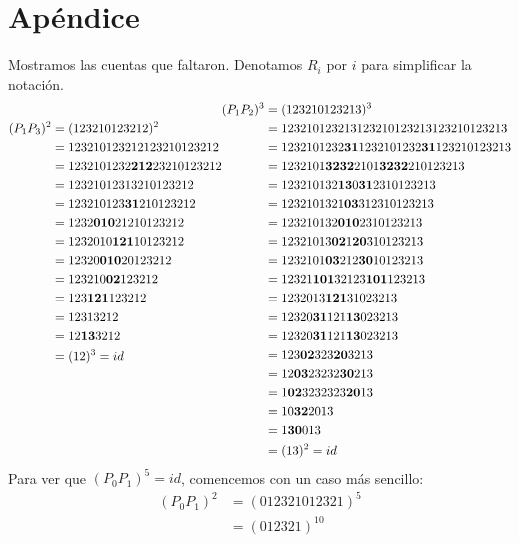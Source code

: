 \documentclass[spanish]{article}
\theoremstyle{definition}
\begin{document}
\section{Apéndice}
Mostramos las cuentas que faltaron. Denotamos $R_i$ por $i$ para simplificar la notación.
\begin{align*}
\begin{aligned}
	(P_1P_3)^2&=(123210123212)^2\\
	&=123210123212123210123212\\
	&=1232101232\mathbf{212}23210123212\\
	&=12321012313210123212\\
	&=123210123\mathbf{31}210123212\\
	&=1232\mathbf{010}21210123212\\
	&=1232010\mathbf{121}10123212\\
	&=12320\mathbf{010}20123212\\
	&=123210\mathbf{02}123212\\
	&=123\mathbf{121}123212\\
	&=12313212\\
	&=12\mathbf{13}3212\\
	&=(12)^3=id
	\\\leavevmode\\\leavevmode\\\leavevmode\\\leavevmode\\
\end{aligned}
\begin{aligned}
	(P_1P_2)^3&=(123210123213)^3\\
	&=123210123213123210123213123210123213\\
	&=1232101232\mathbf{31}1232101232\mathbf{31}123210123213\\
	&=1232101\mathbf{3232}2101\mathbf{3232}210123213\\
	&=123210132\mathbf{13}0\mathbf{31}2310123213\\
	&=1232101321\mathbf{03}312310123213\\
	&=123210132\mathbf{010}2310123213\\
	&=12321013\mathbf{02}1\mathbf{20}310123213\\
	&=1232101\mathbf{03}212\mathbf{30}10123213\\
	&=12321\mathbf{101}32123\mathbf{101}123213\\
	&=1232013\mathbf{121}31023213\\
	&=12320\mathbf{31}121\mathbf{13}023213\\
	&=12320\mathbf{31}121\mathbf{13}023213\\
	&=123\mathbf{02}323\mathbf{20}3213\\
	&=12\mathbf{03}23232\mathbf{30}213\\
	&=1\mathbf{02}3232323\mathbf{20}13\\
	&=10\mathbf{32}2013\\
	&=1\mathbf{30}013\\
	&=(13)^2=id
\end{aligned}
\end{align*}
Para ver que $(P_0P_1)^5=id$, comencemos con un caso más sencillo:
\begin{align*}
	(P_0P_1)^2&=(012321012321)^5\\
	&=(012321)^{10}\\
\end{align*}
\end{document}
